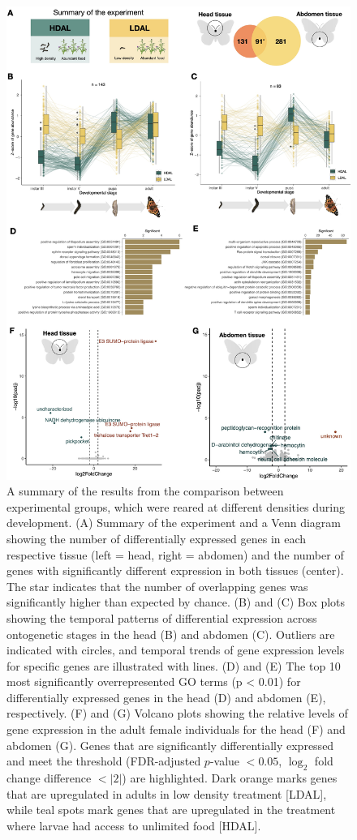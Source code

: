\documentclass[lineno]{wiley-article}
\begin{document}
\begin{figure}[bt]
\includegraphics[width=12cm]{‎Vanessa_RNAseq_fig4.‎001.jpeg}
\caption{A summary of the results from the comparison between experimental groups, which were reared at different densities during development. (A) Summary of the experiment and a Venn diagram showing the number of differentially expressed genes in each respective tissue (left = head, right = abdomen) and the number of genes with significantly different expression in both tissues (center). The star indicates that the number of overlapping genes was significantly higher than expected by chance. (B) and (C) Box plots showing the temporal patterns of differential expression across ontogenetic stages in the head (B) and abdomen (C). Outliers are indicated with circles, and temporal trends of gene expression levels for specific genes are illustrated with lines. (D) and (E) The top 10 most significantly overrepresented GO terms (p < 0.01) for differentially expressed genes in the head (D) and abdomen (E), respectively. (F) and (G) Volcano plots showing the relative levels of gene expression in the adult female individuals for the head (F) and abdomen (G). Genes that are significantly differentially expressed and meet the threshold (FDR-adjusted \(p\)-value \(< 0.05\), \(\log_2\) fold change difference \(< |2|\)) are highlighted. Dark orange marks genes that are upregulated in adults in low density treatment [LDAL], while teal spots mark genes that are upregulated in the treatment where larvae had access to unlimited food [HDAL].}
\end{figure}
\afterpage{\FloatBarrier}
\end{document}
